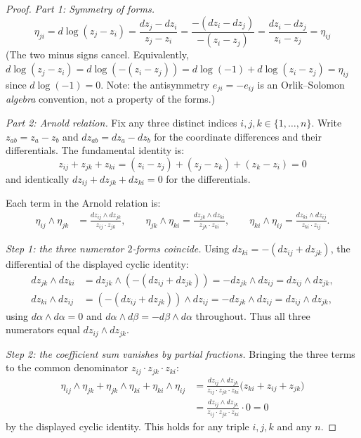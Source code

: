 \begin{proof}
\emph{Part 1: Symmetry of forms.}
\[\eta_{ji} = d\log(z_j - z_i) = \frac{dz_j - dz_i}{z_j - z_i} = \frac{-(dz_i - dz_j)}{-(z_i - z_j)} = \frac{dz_i - dz_j}{z_i - z_j} = \eta_{ij}\]
(The two minus signs cancel. Equivalently, $d\log(z_j-z_i) = d\log(-(z_i-z_j)) = d\log(-1) + d\log(z_i-z_j) = \eta_{ij}$ since $d\log(-1) = 0$. Note: the antisymmetry $e_{ji} = -e_{ij}$ is an Orlik--Solomon \emph{algebra} convention, not a property of the forms.)

\emph{Part 2: Arnold relation.}
Fix any three distinct indices $i,j,k \in \{1,\ldots,n\}$. Write $z_{ab} = z_a - z_b$ and $dz_{ab} = dz_a - dz_b$ for the coordinate differences and their differentials. The fundamental identity is:
  \begin{equation*}
  z_{ij} + z_{jk} + z_{ki} = (z_i - z_j) + (z_j - z_k) + (z_k - z_i) = 0
  \end{equation*}
  and identically $dz_{ij} + dz_{jk} + dz_{ki} = 0$ for the differentials.

Each term in the Arnold relation is:
\begin{align*}
\eta_{ij} \wedge \eta_{jk} &= \frac{dz_{ij} \wedge dz_{jk}}{z_{ij} \cdot z_{jk}}, \qquad
\eta_{jk} \wedge \eta_{ki} = \frac{dz_{jk} \wedge dz_{ki}}{z_{jk} \cdot z_{ki}}, \qquad
\eta_{ki} \wedge \eta_{ij} = \frac{dz_{ki} \wedge dz_{ij}}{z_{ki} \cdot z_{ij}}.
\end{align*}

  \emph{Step 1: the three numerator $2$-forms coincide.} Using
  $dz_{ki} = -(dz_{ij} + dz_{jk})$, the differential of the displayed
  cyclic identity:
\begin{align*}
dz_{jk} \wedge dz_{ki} &= dz_{jk} \wedge (-(dz_{ij} + dz_{jk})) = -dz_{jk} \wedge dz_{ij} = dz_{ij} \wedge dz_{jk}, \\
dz_{ki} \wedge dz_{ij} &= (-(dz_{ij} + dz_{jk})) \wedge dz_{ij} = -dz_{jk} \wedge dz_{ij} = dz_{ij} \wedge dz_{jk},
\end{align*}
using $d\alpha \wedge d\alpha = 0$ and $d\alpha \wedge d\beta = -d\beta \wedge d\alpha$ throughout. Thus all three numerators equal $dz_{ij} \wedge dz_{jk}$.

\emph{Step 2: the coefficient sum vanishes by partial fractions.} Bringing the three terms to the common denominator $z_{ij} \cdot z_{jk} \cdot z_{ki}$:
\begin{align*}
\eta_{ij} \wedge \eta_{jk} + \eta_{jk} \wedge \eta_{ki} + \eta_{ki} \wedge \eta_{ij}
&= \frac{dz_{ij} \wedge dz_{jk}}{z_{ij} \cdot z_{jk} \cdot z_{ki}} \bigl(z_{ki} + z_{ij} + z_{jk}\bigr) \\
&= \frac{dz_{ij} \wedge dz_{jk}}{z_{ij} \cdot z_{jk} \cdot z_{ki}} \cdot 0 = 0
\end{align*}
  by the displayed cyclic identity. This holds for any triple $i,j,k$
  and any $n$.


\end{proof}
